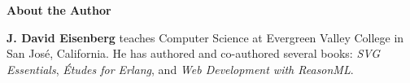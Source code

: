 \documentclass[12pt]{book}
\theoremstyle{exercise}
\newif\ifplastex
\begin{document}

\fi



\mainmatter






































\backmatter

\printindex

\ifplastex
\else

\newpage
\thispagestyle{empty}

\vspace*{40pt}

{\bf\huge About the Author}

{\bf J. David Eisenberg} teaches Computer Science at Evergreen Valley College in San Jos\'e, California. He has authored and co-authored several books: {\it SVG Essentials}, {\it \'Etudes for Erlang}, and {\it Web Development with ReasonML}.

\vspace*{40pt}
\end{document}
